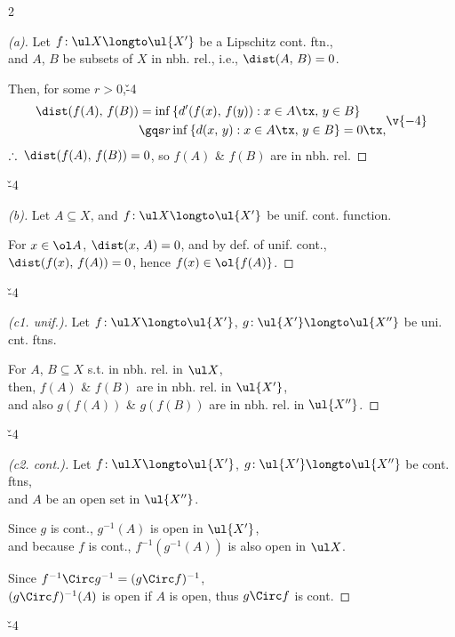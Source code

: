 \documentclass[dvipdfmx,a4paper,titlepage,9pt]{jsarticle}
\begin{document}
\begin{multicols*}{2}
\begin{pfbox}[\!\!: (a), (b)]
\begin{proof}[(a)] Let $f\!:\ul X\longto\ul{X'}$ be a Lipschitz cont. ftn.,\\
and $A$, $B$ be subsets of $X$ in nbh. rel., i.e., $\dist(A,\,B)=0$.

Then, for some $r>0$,\v{-4}
$$\begin{aligned}
\dist(f(A),\,f(B))&=\inf{}\{d'(f(x),\,f(y)):x\in A\tx,\,y\in B\}\\
&\gqs r\inf{}\{d(x,\,y):x\in A\tx,\,y\in B\}=0\tx,
\end{aligned}\v{-4}$$
$\therefore\;\dist(f(A),\,f(B))=0$, so $f(A)$ \& $f(B)$ are in nbh. rel.
\end{proof}\v{-4}

\dotfill

\begin{proof}[(b)] Let $A\subseteq X$, and $f\!: \ul X\longto\ul{X'}$ be unif. cont. function.

For $x\in\ol A$, $\dist(x,\,A)=0$, and by def. of unif. cont.,\\
$\dist(f(x),\,f(A))=0$, hence $f(x)\in\ol{f(A)}$.
\end{proof}\v{-4}
\end{pfbox}

\vfill\null\columnbreak

\begin{pfbox}[\!\!: (c), (d), (f)]
\begin{proof}[(c1. unif.)]
\rnc{\qedsymbol}{\Sq}Let $f\!:\ul X\longto\ul{X'}$, $g\!:\ul{X'}\longto\ul{X''}$ be uni. cnt. ftns.

For $A$, $B\subseteq X$ s.t. in nbh. rel. in $\ul X$,\\
then, $f(A)$ \& $f(B)$ are in nbh. rel. in $\ul{X'}$,\\
and also $g(f(A))$ \& $g(f(B))$ are in nbh. rel. in $\ul{X''}$.
\end{proof}\v{-4}

\dotfill

\begin{proof}[(c2. cont.)] Let $f\!:\ul X\longto\ul{X'}$, $g\!:\ul{X'}\longto\ul{X''}$ be cont. ftns,\\
and $A$ be an open set in $\ul{X''}$.

Since $g$ is cont., $g^{-1}(A)$ is open in $\ul{X'}$,\\
and because $f$ is cont., $f^{-1}(g^{-1}(A))$ is also open in $\ul X$.

Since $f^{-1}\Circ g^{-1}=(g\Circ f)^{-1}$,\\
$(g\Circ f)^{-1}(A)$ is open if $A$ is open, thus $g\Circ f$ is cont.
\end{proof}\v{-4}


\end{pfbox}
\end{multicols*}
\end{document}
